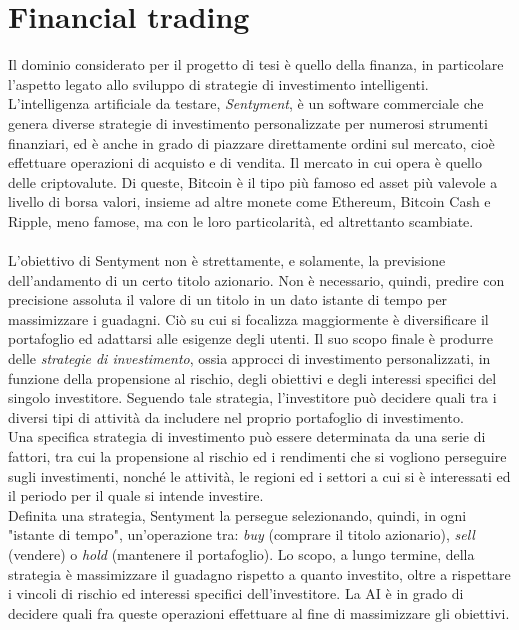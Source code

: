 \documentclass[a4paper,12pt]{report}
\begin{document}
\chapter{Financial trading}
\label{cap1}
Il dominio considerato per il progetto di tesi è quello della finanza, in particolare l'aspetto legato allo sviluppo di strategie di investimento intelligenti.\\
L'intelligenza artificiale da testare, \textit{Sentyment}, è un software commerciale che genera diverse strategie di investimento personalizzate per numerosi strumenti finanziari, ed è anche in grado di piazzare direttamente ordini sul mercato, cioè effettuare operazioni di acquisto e di vendita. Il mercato in cui opera è quello delle criptovalute. Di queste, Bitcoin è il tipo più famoso ed asset più valevole a livello di borsa valori, insieme ad altre monete come Ethereum, Bitcoin Cash e Ripple, meno famose, ma con le loro particolarità, ed altrettanto scambiate.\\~\\
L'obiettivo di Sentyment non è strettamente, e solamente, la previsione dell'andamento di un certo titolo azionario. Non è necessario, quindi, predire con precisione assoluta il valore di un titolo in un dato istante di tempo per massimizzare i guadagni. Ciò su cui si focalizza maggiormente è diversificare il portafoglio ed adattarsi alle esigenze degli utenti. Il suo scopo finale è produrre delle \textit{strategie di investimento}, ossia approcci di investimento personalizzati, in funzione della propensione al rischio, degli obiettivi e degli interessi specifici del singolo investitore. Seguendo tale strategia, l’investitore può decidere quali tra i diversi tipi di attività da includere nel proprio portafoglio di investimento.\\
Una specifica strategia di investimento può essere determinata da una serie di fattori, tra cui la propensione al rischio ed i rendimenti che si vogliono perseguire sugli investimenti, nonché le attività, le regioni ed i settori a cui si è interessati ed il periodo per il quale si intende investire.\\
Definita una strategia, Sentyment la persegue selezionando, quindi, in ogni "istante di tempo", un'operazione tra: \textit{buy} (comprare il titolo azionario), \textit{sell} (vendere) o \textit{hold} (mantenere il portafoglio). Lo scopo, a lungo termine, della strategia è massimizzare il guadagno rispetto a quanto investito, oltre a rispettare i vincoli di rischio ed interessi specifici dell'investitore. La AI è in grado di decidere quali fra queste operazioni effettuare al fine di massimizzare gli obiettivi.\\
\end{document}
